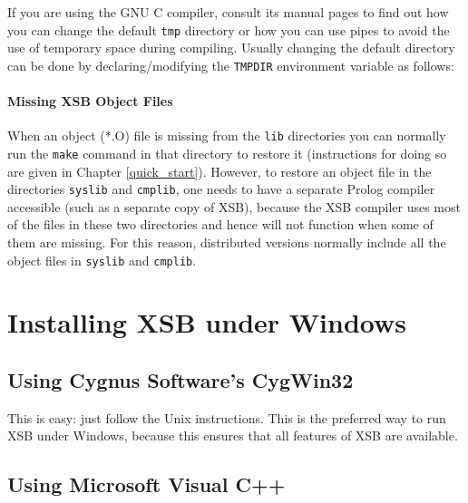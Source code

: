 
\noindent
If you are using the GNU C compiler, consult its manual pages
to find out how you can change the default {\tt tmp} directory or how you
can use pipes to avoid the use of temporary space during compiling.
Usually changing the default directory can be done by declaring/modifying
the {\tt TMPDIR} environment variable as follows:


\paragraph*{Missing XSB Object Files}
When an object (*.O) file is missing from the {\tt lib} directories you can
normally run the {\tt make} command  in that directory to restore it
(instructions for doing so are given in Chapter
\ref{quick_start}).  However, to restore an object file in the
directories {\tt syslib} and {\tt cmplib}, one needs to have a
separate Prolog compiler accessible (such as a separate copy of
XSB), because the XSB compiler uses most of the files in these
two directories and hence will not function when some of them are
missing.  For this reason, distributed versions normally include all
the object files in {\tt syslib} and {\tt cmplib}.

\section{Installing XSB under Windows}
\subsection{Using Cygnus Software's \mbox{CygWin32}}
\label{quick:cygwin}

This is easy: just follow the Unix instructions. This is the preferred way to
run XSB under Windows, because this ensures that all features of XSB are
available.


\subsection{Using Microsoft Visual C++}
\label{quick:DOS}


